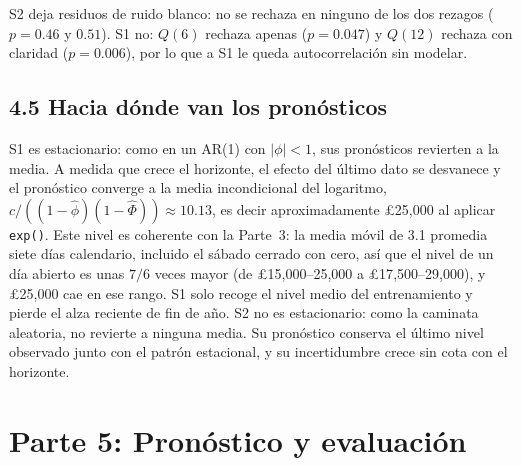 \documentclass[11pt]{article}
\begin{document}
S2 deja residuos de ruido blanco: no se rechaza en ninguno de los dos
rezagos ($p=0.46$ y $0.51$). S1 no: $Q(6)$ rechaza apenas ($p=0.047$) y
$Q(12)$ rechaza con claridad ($p=0.006$), por lo que a S1 le queda
autocorrelaci\'on sin modelar.

\subsection*{4.5 Hacia d\'onde van los pron\'osticos}

S1 es estacionario: como en un AR(1) con $|\phi|<1$, sus pron\'osticos
revierten a la media. A medida que crece el horizonte, el efecto del \'ultimo
dato se desvanece y el pron\'ostico converge a la media incondicional del
logaritmo, $c/((1-\hat\phi)(1-\hat\Phi))\approx10.13$, es decir
aproximadamente \pounds 25{,}000 al aplicar \texttt{exp()}. Este nivel es
coherente con la Parte~3: la media m\'ovil de 3.1 promedia siete d\'ias
calendario, incluido el s\'abado cerrado con cero, as\'i que el nivel de un d\'ia
abierto es unas $7/6$ veces mayor (de \pounds 15{,}000--25{,}000 a
\pounds 17{,}500--29{,}000), y \pounds 25{,}000 cae en ese rango. S1 solo recoge
el nivel medio del entrenamiento y pierde el alza reciente de fin de a\~no.
S2 no es
estacionario: como la caminata aleatoria, no revierte a ninguna media. Su
pron\'ostico conserva el \'ultimo nivel observado junto con el patr\'on
estacional, y su incertidumbre crece sin cota con el horizonte.

\section*{Parte 5: Pronóstico y evaluación}
\end{document}
